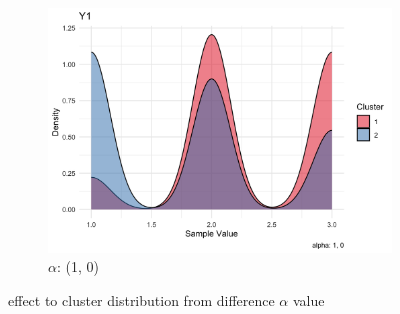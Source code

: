 \documentclass{article}
\begin{document}
\begin{figure}[h]
\begin{subfigure}{0.3\textwidth}
      \centering
      \includegraphics[width=\textwidth]{images/alpha_1_0.png}
      \caption{$\alpha$: (1, 0)}
  \end{subfigure}
  \caption{effect to cluster distribution from difference $\alpha$ value}
  \label{fig:alpha}
\end{figure}

\end{document}
